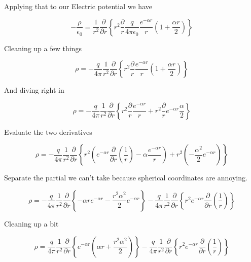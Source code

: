 Applying that to our Electric potential we have

\begin{equation}
  -\frac{\rho}{\epsilon_0}
  = \frac{1}{r^2}
  \frac{\partial}{\partial r}
  \left\{
  r^2 \frac{\partial}{r}
  \frac{q}{4\pi\epsilon_0} \frac{e^{-\alpha r}}{r} \left( 1 +
  \frac{\alpha r}{2} \right)  
  \right\}
\end{equation}

Cleaning up a few things

\begin{equation}
  \rho
  = -\frac{q}{4\pi}
  \frac{1}{r^2}
  \frac{\partial}{\partial r}
  \left\{
  r^2 \frac{\partial}{r}
  \frac{e^{-\alpha r}}{r} \left( 1 + \frac{\alpha r}{2} \right)
  \right\}
\end{equation}

And diving right in

\begin{equation}
  \rho
  = -\frac{q}{4\pi}
  \frac{1}{r^2}
  \frac{\partial}{\partial r}
  \left\{
  r^2 \frac{\partial}{r}
  \frac{e^{-\alpha r}}{r}
  + r^2 \frac{\partial}{r}
  e^{-\alpha r}\frac{\alpha}{2}
  \right\}
\end{equation}

Evaluate the two derivatives

\begin{equation}
  \rho
  = -\frac{q}{4\pi}
  \frac{1}{r^2}
  \frac{\partial}{\partial r}
  \left\{
  r^2 \left(
  e^{-\alpha r}
  \frac{\partial}{\partial r}  
  \left(\frac{1}{r}\right)
  - \alpha \frac{e^{-\alpha r}}{r}
  \right)
  + r^2 \left(
  - \frac{\alpha^2}{2}
  e^{-\alpha r}
  \right)
  \right\}
\end{equation}

Separate the partial we can't take because spherical coordinates are
annoying.

\begin{equation}
  \rho
  = -\frac{q}{4\pi}
  \frac{1}{r^2}
  \frac{\partial}{\partial r}
  \left\{
  -\alpha r e^{-\alpha r}
  - \frac{r^2\alpha^2}{2}
  e^{-\alpha r}
  \right\}
  -\frac{q}{4\pi}  
  \frac{1}{r^2}
  \frac{\partial}{\partial r}
  \left\{
  r^2
  e^{-\alpha r}
  \frac{\partial}{\partial r}  
  \left(\frac{1}{r}\right)
  \right\}
\end{equation}

Cleaning up a bit

\begin{equation}
  \rho
  = \frac{q}{4\pi}
  \frac{1}{r^2}
  \frac{\partial}{\partial r}
  \left\{
  e^{-\alpha r}
  \left(
  \alpha r
  + \frac{r^2\alpha^2}{2}
  \right)
  \right\}
  -\frac{q}{4\pi}  
  \frac{1}{r^2}
  \frac{\partial}{\partial r}
  \left\{
  r^2
  e^{-\alpha r}
  \frac{\partial}{\partial r}  
  \left(\frac{1}{r}\right)
  \right\}
\end{equation}

